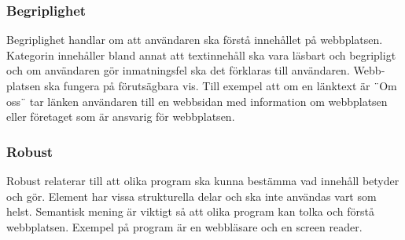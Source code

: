 \documentclass[11p]{article}
\begin{document}
\begin{otherlanguage}{swedish}
    \subsubsection{Begriplighet}
    Begriplighet handlar om att användaren ska förstå innehållet på webbplatsen.
    Kategorin innehåller bland annat att textinnehåll ska vara läsbart och begripligt och
    om användaren gör inmatningsfel ska det förklaras till användaren.
    Webbplatsen ska fungera på förutsägbara vis.
    Till exempel att om en länktext är ¨Om oss¨ tar länken användaren till en webbsidan med information om webbplatsen eller företaget som är ansvarig för webbplatsen.

    \subsubsection{Robust}
    Robust relaterar till att olika program ska kunna bestämma vad innehåll betyder och gör.
    Element har vissa strukturella delar och ska inte användas vart som helst.
    Semantisk mening är viktigt så att olika program kan tolka och förstå webbplatsen.
    Exempel på program är en webbläsare och en screen reader.


\end{otherlanguage}
\end{document}
